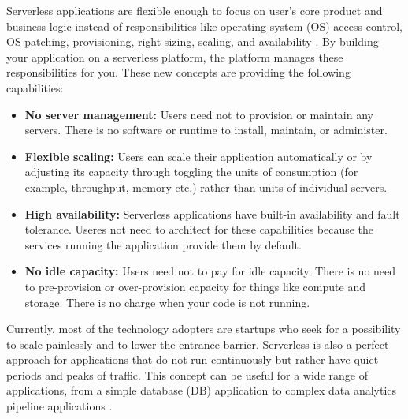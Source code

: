 \noindent Serverless applications are flexible enough to focus on user's core product and business logic instead of responsibilities like operating system (OS) access control, OS patching, provisioning, right-sizing, scaling, and availability \cite{Lloyd_2018}. By building your application on a serverless platform, the platform manages these responsibilities for you. These new concepts are providing the following capabilities:
\begin{itemize}
	\item \textbf{No server management:} Users need not to provision or maintain any servers. There is no software or runtime to install, maintain, or administer.
	\item \textbf{Flexible scaling:} Users can scale their application automatically or by adjusting its capacity through toggling the units of consumption (for example, throughput, memory etc.) rather than units of individual servers.
	\item \textbf{High availability:} Serverless applications have built-in availability and fault tolerance. Useres not need to architect for these capabilities because the services running the application provide them by default.
	\item \textbf{No idle capacity:} Users need not to pay for idle capacity. There is no need to pre-provision or over-provision capacity for things like compute and storage. There is no charge when your code is not running.
\end{itemize}


Currently, most of the technology adopters are startups who seek for a possibility to scale painlessly and to lower the entrance barrier. Serverless is also a perfect approach for applications that do not run continuously but rather have quiet periods and peaks of traffic. This concept can be useful for a wide range of applications, from a simple database (DB) application to complex data analytics pipeline applications \cite{Bhattacharjee_USENIX_2019}.
%	
% 

